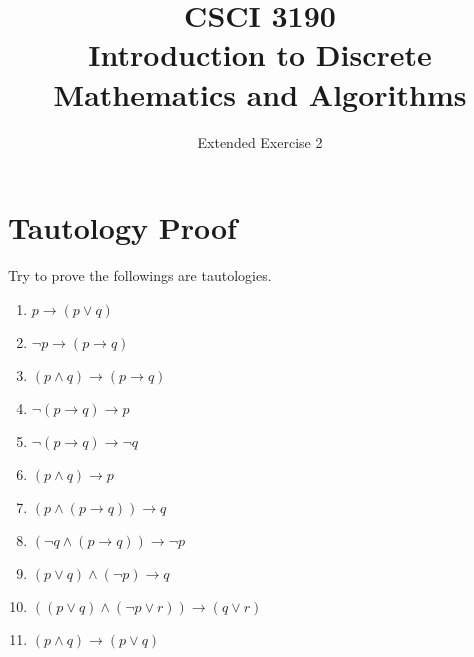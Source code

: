 \documentclass{../../cls/sig-alternate-05-2015}
\begin{document}






%

\title{CSCI 3190 \\ Introduction to Discrete Mathematics and Algorithms}
\subtitle{Extended Exercise 2}

\maketitle
\begin{abstract}

\end{abstract}

\keywords{}

\section{Tautology Proof}
Try to prove the followings are tautologies.
\begin{enumerate}
\item $p \rightarrow (p\vee q )$
\item $\neg p \rightarrow (p \rightarrow q)$
\item $(p \wedge q) \rightarrow (p \rightarrow q)$
\item $\neg (p \rightarrow q) \rightarrow p$
\item $\neg (p \rightarrow q) \rightarrow \neg q$
\item $(p \wedge q) \rightarrow p$
\item $(p \wedge (p \rightarrow q)) \rightarrow q$
\item $(\neg q \wedge (p \rightarrow q)) \rightarrow \neg p$
\item $ (p\vee q) \wedge (\neg p) \rightarrow q$
\item $ ((p \vee q) \wedge (\neg p \vee r)) \rightarrow (q \vee r)$
\item $(p \wedge q) \rightarrow (p \vee q)$
\end{enumerate}
\end{document}

